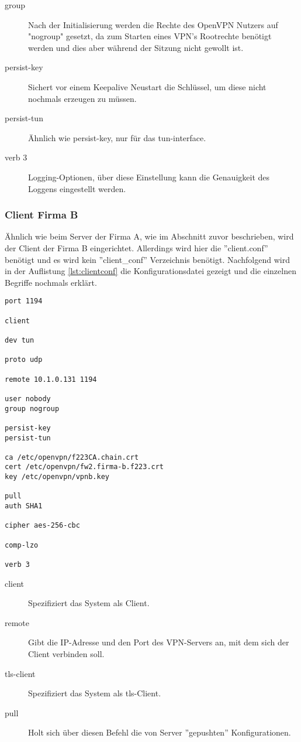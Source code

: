 \begin{description}
	\item[group]Nach der Initialisierung werden die Rechte des OpenVPN Nutzers auf "nogroup" gesetzt, da zum Starten eines VPN's Rootrechte benötigt werden und dies aber während der Sitzung nicht gewollt ist.
	\item[persist-key] Sichert vor einem Keepalive Neustart die Schlüssel, um diese nicht nochmals erzeugen zu müssen.
	\item[persist-tun] Ähnlich wie persist-key, nur für das tun-interface.  
	\item[verb 3] Logging-Optionen, über diese Einstellung kann die Genauigkeit des Loggens eingestellt werden.
\end{description}

\subsubsection{Client Firma B}
Ähnlich wie beim Server der Firma A, wie im Abschnitt zuvor beschrieben, wird der Client der Firma B eingerichtet. Allerdings wird hier die ''client.conf'' benötigt und es wird kein ''client\_conf'' Verzeichnis benötigt. Nachfolgend wird in der Auflistung \ref{lst:clientconf} die Konfigurationsdatei gezeigt und die einzelnen Begriffe nochmals erklärt.\newline
\lstset{
	basicstyle=\footnotesize, frame=tb,
	xleftmargin=.2\textwidth, xrightmargin=.2\textwidth
}
\begin{lstlisting}[caption={client.conf Datei der Firma B},label=lst:clientconf]
port 1194

client

dev tun

proto udp

remote 10.1.0.131 1194

user nobody
group nogroup

persist-key
persist-tun

ca /etc/openvpn/f223CA.chain.crt
cert /etc/openvpn/fw2.firma-b.f223.crt
key /etc/openvpn/vpnb.key

pull
auth SHA1

cipher aes-256-cbc

comp-lzo

verb 3
\end{lstlisting}
\vspace{\baselineskip}
\begin{description}
	\item[client] Spezifiziert das System als Client.
	\item[remote] Gibt die IP-Adresse und den Port des VPN-Servers an, mit dem sich der Client verbinden soll.
	\item[tls-client] Spezifiziert das System als tls-Client.
	\item[pull] Holt sich über diesen Befehl die von Server ''gepushten'' Konfigurationen.
\end{description}









